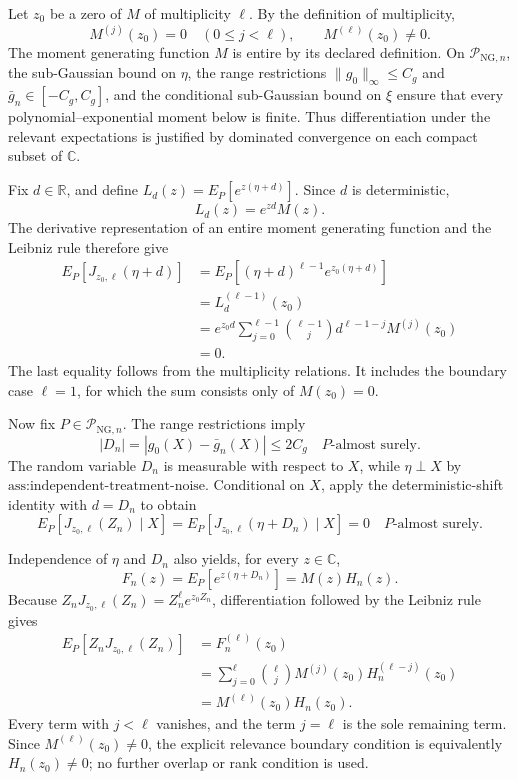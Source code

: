 Let \(z_0\) be a zero of \(M\) of multiplicity \(\ell\). By the definition of multiplicity,
\[
M^{(j)}(z_0)=0\quad(0\le j<\ell),
\qquad
M^{(\ell)}(z_0)\ne0.
\]
The moment generating function \(M\) is entire by its declared definition. On \(\mathcal P_{\mathrm{NG},n}\), the sub-Gaussian bound on \(\eta\), the range restrictions \(\lVert g_0\rVert_\infty\le C_g\) and \(\bar g_n\in[-C_g,C_g]\), and the conditional sub-Gaussian bound on \(\xi\) ensure that every polynomial--exponential moment below is finite. Thus differentiation under the relevant expectations is justified by dominated convergence on each compact subset of \(\mathbb C\).

Fix \(d\in\mathbb R\), and define \(L_d(z)=E_P[e^{z(\eta+d)}]\). Since \(d\) is deterministic,
\[
L_d(z)=e^{zd}M(z).
\]
The derivative representation of an entire moment generating function and the Leibniz rule therefore give
\[
\begin{aligned}
E_P[J_{z_0,\ell}(\eta+d)]
&=E_P[(\eta+d)^{\ell-1}e^{z_0(\eta+d)}]\\
&=L_d^{(\ell-1)}(z_0)\\
&=e^{z_0d}\sum_{j=0}^{\ell-1}{\ell-1\choose j}
d^{\ell-1-j}M^{(j)}(z_0)\\
&=0.
\end{aligned}
\]
The last equality follows from the multiplicity relations. It includes the boundary case \(\ell=1\), for which the sum consists only of \(M(z_0)=0\).

Now fix \(P\in\mathcal P_{\mathrm{NG},n}\). The range restrictions imply
\[
|D_n|=|g_0(X)-\bar g_n(X)|\le 2C_g
\quad P\text{-almost surely}.
\]
The random variable \(D_n\) is measurable with respect to \(X\), while \(\eta\perp X\) by \(\text{ass:independent-treatment-noise}\). Conditional on \(X\), apply the deterministic-shift identity with \(d=D_n\) to obtain
\[
E_P[J_{z_0,\ell}(Z_n)\mid X]
=E_P[J_{z_0,\ell}(\eta+D_n)\mid X]
=0
\quad P\text{-almost surely}.
\]

Independence of \(\eta\) and \(D_n\) also yields, for every \(z\in\mathbb C\),
\[
F_n(z)=E_P[e^{z(\eta+D_n)}]=M(z)H_n(z).
\]
Because \(Z_nJ_{z_0,\ell}(Z_n)=Z_n^\ell e^{z_0Z_n}\), differentiation followed by the Leibniz rule gives
\[
\begin{aligned}
E_P[Z_nJ_{z_0,\ell}(Z_n)]
&=F_n^{(\ell)}(z_0)\\
&=\sum_{j=0}^{\ell}{\ell\choose j}
M^{(j)}(z_0)H_n^{(\ell-j)}(z_0)\\
&=M^{(\ell)}(z_0)H_n(z_0).
\end{aligned}
\]
Every term with \(j<\ell\) vanishes, and the term \(j=\ell\) is the sole remaining term. Since \(M^{(\ell)}(z_0)\ne0\), the explicit relevance boundary condition is equivalently \(H_n(z_0)\ne0\); no further overlap or rank condition is used.

